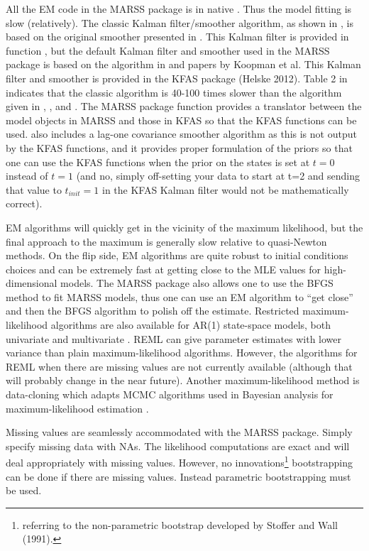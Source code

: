 All the EM code in the MARSS package is in native \R.  Thus the model fitting is slow (relatively).  The classic Kalman filter/smoother algorithm, as shown in \citet[p. 331-335]{ShumwayStoffer2006}, is based on the original smoother presented in \citet{Rauch1963}. This Kalman filter is provided in function \verb@MARSSkfss@, but the default Kalman filter and smoother used in the MARSS package is based on the algorithm in \citet{KohnAnsley1989} and papers by Koopman et al. This Kalman filter and smoother is provided in the KFAS package (Helske 2012).  Table 2 in \citet{Koopman1993} indicates that the classic algorithm is 40-100 times slower than the algorithm given in \citet{KohnAnsley1989}, \citet{Koopman1993}, and \citet{Koopmanetal1998}. The MARSS package function \verb@MARSSkfas@ provides a translator between the model objects in MARSS and those in KFAS so that the KFAS functions can be used.  \verb@MARSSkfas@ also includes a lag-one covariance smoother algorithm as this is not output by the KFAS functions, and it provides proper formulation of the priors so that one can use the KFAS functions when the prior on the states is set at $t=0$ instead of $t=1$ (and no, simply off-setting your data to start at t=2 and sending that value to $t_{init}=1$ in the KFAS Kalman filter would not be mathematically correct).

EM algorithms will quickly get in the vicinity of the maximum likelihood, but the final approach to the maximum is generally slow relative to quasi-Newton methods.  On the flip side, EM algorithms are quite robust to initial conditions choices and can be extremely fast at getting close to the MLE values for high-dimensional models.  The MARSS package also allows one to use the BFGS method to fit MARSS models, thus one can use an EM algorithm to ``get close'' and then the BFGS algorithm to polish off the estimate. Restricted maximum-likelihood algorithms are also available for AR(1) state-space models, both univariate \citep{Staplesetal2004} and multivariate \citep{Hinrichsen2009}.  REML can give parameter estimates with lower variance than plain maximum-likelihood algorithms.  However, the algorithms for REML when there are missing values are not currently available (although that will probably change in the near future).  Another maximum-likelihood method is data-cloning which adapts MCMC algorithms used in Bayesian analysis for maximum-likelihood estimation \citep{Leleetal2007}.  

Missing values are seamlessly accommodated with the MARSS package.  Simply specify missing data with NAs.  The likelihood computations are exact and will deal appropriately with missing values.  However, no innovations\footnote{referring to the non-parametric bootstrap developed by Stoffer and Wall (1991).} bootstrapping can be done if there are missing values.  Instead parametric bootstrapping must be used.

